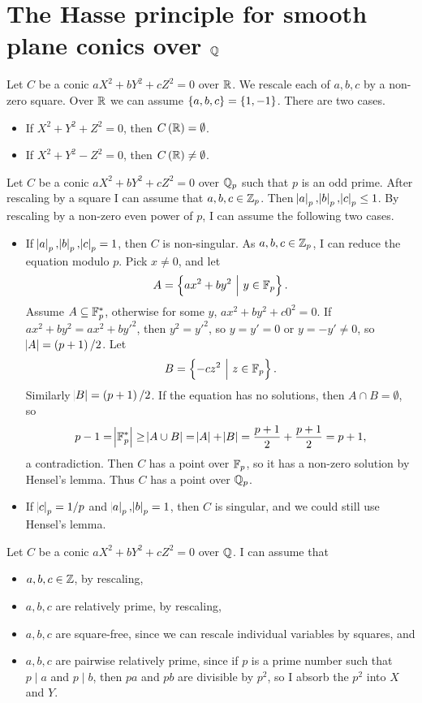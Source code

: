 \section{The Hasse principle for smooth plane conics over \texorpdfstring{$ \mathbb{Q} $}{Q}}


Let $ C $ be a conic $ aX^2 + bY^2 + cZ^2 = 0 $ over $ \mathbb{R} $. We rescale each of $ a, b, c $ by a non-zero square. Over $ \mathbb{R} $ we can assume $ \cbr{a, b, c} = \cbr{1, -1} $. There are two cases.
\begin{itemize}
\item If $ X^2 + Y^2 + Z^2 = 0 $, then $ C\br{\RR} = \emptyset $.
\item If $ X^2 + Y^2 - Z^2 = 0 $, then $ C\br{\RR} \ne \emptyset $.
\end{itemize}
Let $ C $ be a conic $ aX^2 + bY^2 + cZ^2 = 0 $ over $ \mathbb{Q}_p $ such that $ p $ is an odd prime. After rescaling by a square I can assume that $ a, b, c \in \mathbb{Z}_p $. Then $ \abs{a}_p, \abs{b}_p, \abs{c}_p \le 1 $. By rescaling by a non-zero even power of $ p $, I can assume the following two cases.
\begin{itemize}
\item If $ \abs{a}_p, \abs{b}_p, \abs{c}_p = 1 $, then $ C $ is non-singular. As $ a, b, c \in \mathbb{Z}_p $, I can reduce the equation modulo $ p $. Pick $ x \ne 0 $, and let
$$ A = \cbr{ax^2 + by^2 \st y \in \FF_p}. $$
Assume $ A \subseteq \mathbb{F}_p^* $, otherwise for some $ y $, $ ax^2 + by^2 + c0^2 = 0 $. If $ ax^2 + by^2 = ax^2 + by'^2 $, then $ y^2 = y'^2 $, so $ y = y' = 0 $ or $ y = -y' \ne 0 $, so $ \abs{A} = \br{p + 1} / 2 $. Let
$$ B = \cbr{-cz^2 \st z \in \FF_p}. $$
Similarly $ \abs{B} = \br{p + 1} / 2 $. If the equation has no solutions, then $ A \cap B = \emptyset $, so
$$ p - 1 = \abs{\mathbb{F}_p^*} \ge \abs{A \cup B} = \abs{A} + \abs{B} = \dfrac{p + 1}{2} + \dfrac{p + 1}{2} = p + 1, $$
a contradiction. Then $ C $ has a point over $ \mathbb{F}_p $, so it has a non-zero solution by Hensel's lemma. Thus $ C $ has a point over $ \mathbb{Q}_p $.
\item If $ \abs{c}_p = 1 / p $ and $ \abs{a}_p, \abs{b}_p = 1 $, then $ C $ is singular, and we could still use Hensel's lemma.
\end{itemize}
Let $ C $ be a conic $ aX^2 + bY^2 + cZ^2 = 0 $ over $ \mathbb{Q} $. I can assume that
\begin{itemize}
\item $ a, b, c \in \mathbb{Z} $, by rescaling,
\item $ a, b, c $ are relatively prime, by rescaling,
\item $ a, b, c $ are square-free, since we can rescale individual variables by squares, and
\item $ a, b, c $ are pairwise relatively prime, since if $ p $ is a prime number such that $ p \mid a $ and $ p \mid b $, then $ pa $ and $ pb $ are divisible by $ p^2 $, so I absorb the $ p^2 $ into $ X $ and $ Y $.
\end{itemize}
